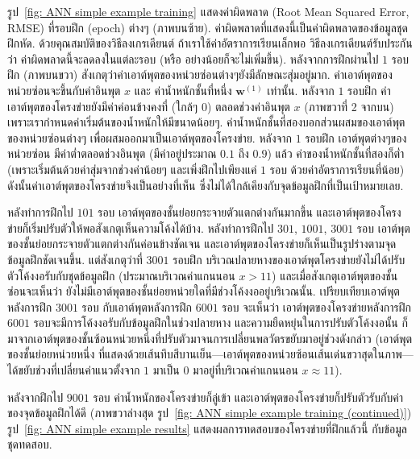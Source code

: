 รูป~\ref{fig: ANN simple example training} แสดงค่าผิดพลาด (Root Mean Squared Error, RMSE) ที่รอบฝึก (epoch) ต่างๆ (ภาพบนซ้าย).
ค่าผิดพลาดที่แสดงนี้เป็นค่าผิดพลาดของข้อมูลชุดฝึกหัด.
ด้วยคุณสมบัติของวิธีลงเกรเดียนต์ ถ้าเราใช้ค่าอัตราการเรียนเล็กพอ 
วิธีลงเกรเดียนต์รับประกันว่า ค่าผิดพลาดนี้จะลดลงในแต่ละรอบ (หรือ อย่างน้อยก็จะไม่เพิ่มขึ้น).
หลังจากการฝึกผ่านไป $1$ รอบฝึก (ภาพบนขวา) สังเกตุว่าค่าเอาต์พุตของหน่วยซ่อนต่างๆยังมีลักษณะสุ่มอยู่มาก.
ค่าเอาต์พุตของหน่วยซ่อนจะขึ้นกับค่าอินพุต $x$ และ ค่าน้ำหนักชั้นที่หนึ่ง $\mathbf{w}^{(1)}$ เท่านั้น.
หลังจาก $1$ รอบฝึก ค่าเอาต์พุตของโครงข่ายยังมีค่าค่อนข้างคงที่ (ใกล้ๆ $0$) ตลอดช่วงค่าอินพุต $x$ (ภาพขวาที่ 2 จากบน) เพราะเรากำหนดค่าเริ่มต้นของน้ำหนักให้มีขนาดน้อยๆ.
ค่าน้ำหนักชั้นที่สองบอกส่วนผสมของเอาต์พุตของหน่วยซ่อนต่างๆ เพื่อผสมออกมาเป็นเอาต์พุตของโครงข่าย.
หลังจาก $1$ รอบฝึก เอาต์พุตต่างๆของหน่วยซ่อน มีค่าต่ำตลอดช่วงอินพุต (มีค่าอยู่ประมาณ $0.1$ ถึง $0.9$) แล้ว ค่าของน้ำหนักชั้นที่สองก็ต่ำ (เพราะเริ่มต้นด้วยค่าสุ่มจากช่วงค่าน้อยๆ และเพิ่งฝึกไปเพียงแค่ $1$ รอบ ด้วยค่าอัตราการเรียนที่น้อย) ดังนั้นค่าเอาต์พุตของโครงข่ายจึงเป็นอย่างที่เห็น ซึ่งไม่ได้ใกล้เคียงกับจุดข้อมูลฝึกที่เป็นเป้าหมายเลย.

หลังทำการฝึกไป $101$ รอบ เอาต์พุตของชั้นย่อยกระจายตัวแตกต่างกันมากขึ้น และเอาต์พุตของโครงข่ายก็เริ่มปรับตัวให้พอสังเกตุเห็นความโค้งได้บ้าง.
หลังทำการฝึกไป $301$, $1001$, $3001$ รอบ เอาต์พุตของชั้นย่อยกระจายตัวแตกต่างกันค่อนข้างชัดเจน และเอาต์พุตของโครงข่ายก็เห็นเป็นรูปร่างตามจุดข้อมูลฝึกชัดเจนขึ้น.
แต่สังเกตุว่าที่ $3001$ รอบฝึก บริเวณปลายหางของเอาต์พุตโครงข่ายยังไม่ได้ปรับตัวโค้งงอรับกับชุดข้อมูลฝึก (ประมาณบริเวณค่าแกนนอน $x > 11$) 
และเมื่อสังเกตุเอาต์พุตของชั้นซ่อนจะเห็นว่า ยังไม่มีเอาต์พุตของชั้นย่อยหน่วยใดที่มีช่วงโค้งงออยู่บริเวณนั้น.
เปรียบเทียบเอาต์พุตหลังการฝึก $3001$ รอบ กับเอาต์พุตหลังการฝึก $6001$ รอบ 
จะเห็นว่า เอาต์พุตของโครงข่ายหลังการฝึก $6001$ รอบจะมีการโค้งงอรับกับข้อมูลฝึกในช่วงปลายหาง 
และความยืดหยุ่นในการปรับตัวโค้งงอนั้น
ก็มาจากเอาต์พุตของชั้นซ้อนหน่วยหนึ่งที่ปรับตัวมาจนการเปลี่ยนพลวัตรขยับมาอยู่ช่วงดังกล่าว (เอาต์พุตของชั้นย่อยหน่วยหนึ่ง ที่แสดงด้วยเส้นทึบสีบานเย็น---เอาต์พุตของหน่วยซ้อนเส้นเด่นขวาสุดในภาพ---ได้ขยับช่วงที่เปลี่ยนค่าแนวตั้งจาก $1$ มาเป็น $0$ มาอยู่ที่บริเวณค่าแกนนอน $x \approx 11$).

หลังจากฝึกไป $9001$ รอบ ค่าน้ำหนักของโครงข่ายก็ลู่เข้า 
และเอาต์พุตของโครงข่ายก็ปรับตัวรับกับค่าของจุดข้อมูลฝึกได้ดี (ภาพขวาล่างสุด รูป~\ref{fig: ANN simple example training (continued)})
รูป~\ref{fig: ANN simple example results} แสดงผลการทดสอบของโครงข่ายที่ฝึกแล้วนี้ กับข้อมูลชุดทดสอบ.

